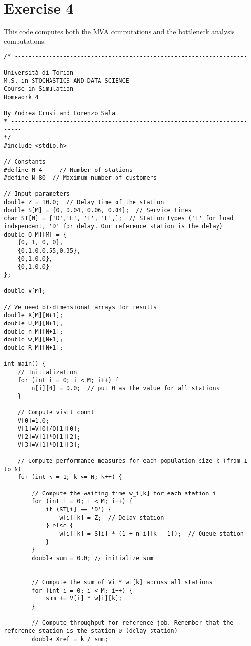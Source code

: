 \documentclass[12pt]{article}
\begin{document}
	\section*{Exercise 4}
	This code computes both the MVA computations and the bottleneck analysis computations.
	\begin{verbatim}
/* -------------------------------------------------------------------------
Università di Torion
M.S. in STOCHASTICS AND DATA SCIENCE
Course in Simulation
Homework 4

By Andrea Crusi and Lorenzo Sala
* ------------------------------------------------------------------------- 
*/
#include <stdio.h>

// Constants
#define M 4     // Number of stations
#define N 80  // Maximum number of customers

// Input parameters
double Z = 10.0;  // Delay time of the station
double S[M] = {0, 0.04, 0.06, 0.04};  // Service times
char ST[M] = {'D','L', 'L', 'L',};  // Station types ('L' for load independent, 'D' for delay. Our reference station is the delay)
double Q[M][M] = {
	{0, 1, 0, 0},
	{0.1,0,0.55,0.35},
	{0,1,0,0},
	{0,1,0,0}
};

double V[M];

// We need bi-dimensional arrays for results
double X[M][N+1];
double U[M][N+1]; 
double n[M][N+1];
double w[M][N+1];
double R[M][N+1];

int main() {
	// Initialization
	for (int i = 0; i < M; i++) {
		n[i][0] = 0.0;  // put 0 as the value for all stations
	}
	
	// Compute visit count
	V[0]=1.0;
	V[1]=V[0]/Q[1][0];
	V[2]=V[1]*Q[1][2];
	V[3]=V[1]*Q[1][3];
	
	// Compute performance measures for each population size k (from 1 to N)
	for (int k = 1; k <= N; k++) {
		
		// Compute the waiting time w_i[k] for each station i
		for (int i = 0; i < M; i++) {
			if (ST[i] == 'D') {
				w[i][k] = Z;  // Delay station
			} else {
				w[i][k] = S[i] * (1 + n[i][k - 1]);  // Queue station
			}
		}
		double sum = 0.0; // initialize sum
		
		
		// Compute the sum of Vi * wi[k] across all stations
		for (int i = 0; i < M; i++) {
			sum += V[i] * w[i][k];
		}
		
		// Compute throughput for reference job. Remember that the reference station is the station 0 (delay station)
		double Xref = k / sum;
		

\end{verbatim}
\end{document}

